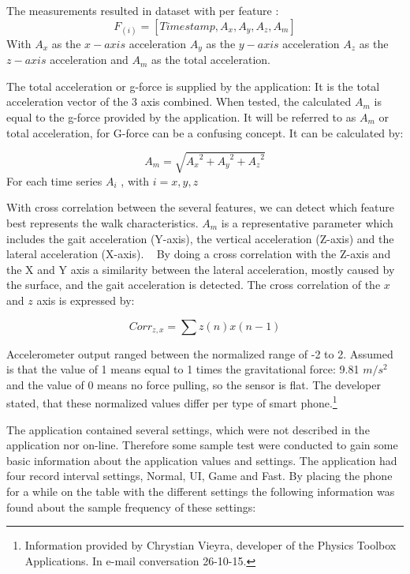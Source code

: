 The measurements resulted in dataset with per feature :
\begin{equation} 
	F_(i) = [ Time stamp, A_{x}, A_{y}, A_{z}, A_{m}] 
\end{equation}
With $A_{x}$ as the $x-axis$ acceleration
$A_{y}$ as the $y-axis$ acceleration
$A_{z}$ as the $z-axis$ acceleration and
$A_{m}$ as the total acceleration.

The total acceleration or g-force is supplied by the application: It is the total acceleration vector of the 3 axis combined. When tested, the calculated $A_{m}$ is equal to the g-force provided by the application. It will be referred to as $A_{m}$ or total acceleration, for G-force can be a confusing concept. It can be calculated by:

\begin{equation}
A_{m} = \sqrt {{A_{x}}^{2} + {A_{y}}^{2} + {A_{z}}^ {2}}
\end{equation} For each time series $A_{i}$ , with $i = {x, y, z}$ 

With cross correlation between the several features, we can detect which feature best represents the walk characteristics. $A_{m}$ is a representative parameter which includes the gait acceleration (Y-axis), the vertical acceleration (Z-axis) and the lateral acceleration (X-axis). ~\cite{Weiss2014} By doing a cross correlation with the Z-axis and the X and Y axis a similarity between the lateral acceleration, mostly caused by the surface, and the gait acceleration is detected. The cross correlation of the $x$ and $z$ axis is expressed by:

\begin{equation}
Corr_{z,x} = \sum z(n)x(n-1)  %
\end{equation}

Accelerometer output ranged between the normalized range of -2 to 2. Assumed is that the value of 1 means equal to 1 times the gravitational force: 9.81 $m/s^2$ and the value of 0 means no force pulling, so the sensor is flat. The developer stated, that these normalized values differ per type of smart phone.\footnote{Information provided by Chrystian Vieyra, developer of the Physics Toolbox Applications. In e-mail conversation 26-10-15. }

The application contained several settings, which were not described in the application nor on-line. Therefore some sample test were conducted to gain some basic information about the application values and settings. The application had four record interval settings, Normal, UI, Game and Fast. By placing the phone for a while on the table with the different settings the following information was found about the sample frequency of these settings: 

